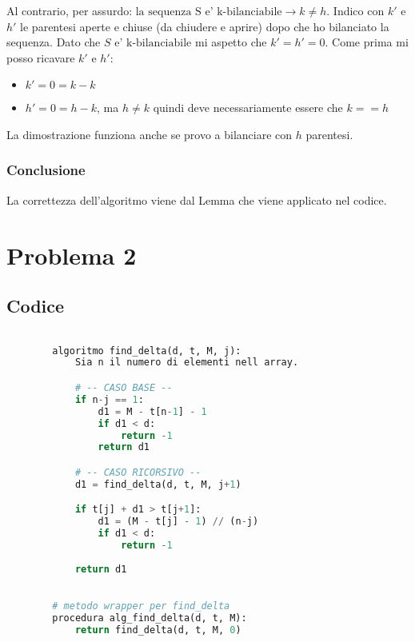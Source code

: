 \documentclass{article}
\begin{document}
                Al contrario, per assurdo: $\text{la sequenza S e' k-bilanciabile} \to k \neq h$. 
                Indico con $k'$ e $h'$ le parentesi aperte e chiuse (da chiudere e aprire) dopo che ho bilanciato la sequenza. 
                Dato che $S$ e' $\text{k-bilanciabile}$ mi aspetto che $k'=h'=0$. 
                Come prima mi posso ricavare $k'$ e $h'$:
                \begin{itemize}
                    \item $k' = 0 = k-k$
                    \item $h' = 0 = h-k$, ma $h\neq k$ quindi deve necessariamente essere che $k==h$
                \end{itemize}

                La dimostrazione funziona anche se provo a bilanciare con $h$ parentesi.
        \subsubsection {Conclusione }
            La correttezza dell'algoritmo viene dal Lemma che viene applicato nel codice.

\newpage

\section{ Problema 2 }

    \subsection{ Codice }
        \begin{lstlisting}[language=Python]

        algoritmo find_delta(d, t, M, j):
            Sia n il numero di elementi nell array.

            # -- CASO BASE --
            if n-j == 1:
                d1 = M - t[n-1] - 1
                if d1 < d:
                    return -1
                return d1

            # -- CASO RICORSIVO --
            d1 = find_delta(d, t, M, j+1)

            if t[j] + d1 > t[j+1]:
                d1 = (M - t[j] - 1) // (n-j)
                if d1 < d:
                    return -1
            
            return d1
            

        # metodo wrapper per find_delta
        procedura alg_find_delta(d, t, M):
            return find_delta(d, t, M, 0)
            
        \end{lstlisting}
\end{document}

